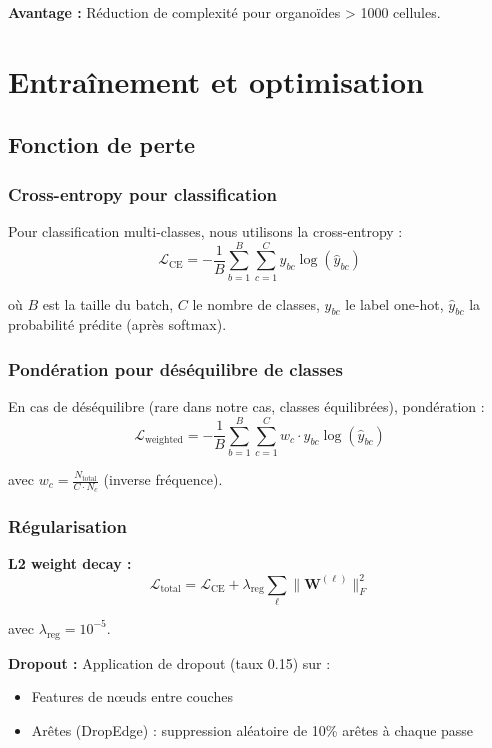 \textbf{Avantage :} Réduction de complexité pour organoïdes > 1000 cellules.

\section{Entraînement et optimisation}

\subsection{Fonction de perte}

\subsubsection{Cross-entropy pour classification}

Pour classification multi-classes, nous utilisons la cross-entropy :
\[
\mathcal{L}_{\text{CE}} = -\frac{1}{B}\sum_{b=1}^B \sum_{c=1}^C y_{bc} \log(\hat{y}_{bc})
\]

où $B$ est la taille du batch, $C$ le nombre de classes, $y_{bc}$ le label one-hot, $\hat{y}_{bc}$ la probabilité prédite (après softmax).

\subsubsection{Pondération pour déséquilibre de classes}

En cas de déséquilibre (rare dans notre cas, classes équilibrées), pondération :
\[
\mathcal{L}_{\text{weighted}} = -\frac{1}{B}\sum_{b=1}^B \sum_{c=1}^C w_c \cdot y_{bc} \log(\hat{y}_{bc})
\]

avec $w_c = \frac{N_{\text{total}}}{C \cdot N_c}$ (inverse fréquence).

\subsubsection{Régularisation}

\textbf{L2 weight decay :}
\[
\mathcal{L}_{\text{total}} = \mathcal{L}_{\text{CE}} + \lambda_{\text{reg}} \sum_{\ell} \|\mathbf{W}^{(\ell)}\|_F^2
\]

avec $\lambda_{\text{reg}} = 10^{-5}$.

\textbf{Dropout :}
Application de dropout (taux 0.15) sur :
\begin{itemize}
    \item Features de nœuds entre couches
    \item Arêtes (DropEdge) : suppression aléatoire de 10\% arêtes à chaque passe
\end{itemize}

